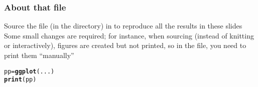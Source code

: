 \documentclass[aspectratio=169]{beamer}\usepackage[]{graphicx}\usepackage[]{xcolor}
\makeatletter
\newcommand{\hldef}[1]{\textcolor[rgb]{0.345,0.345,0.345}{#1}}%
\newcommand{\hlkwb}[1]{\textcolor[rgb]{0.69,0.353,0.396}{#1}}%
\newcommand{\hlkwd}[1]{\textcolor[rgb]{0.737,0.353,0.396}{\textbf{#1}}}%
\newenvironment{kframe}{%
 \def\at@end@of@kframe{}%
 \ifinner\ifhmode%
  \def\at@end@of@kframe{\end{minipage}}%
  \begin{minipage}{\columnwidth}%
 \fi\fi%
 \def\FrameCommand##1{\hskip\@totalleftmargin \hskip-\fboxsep
 \colorbox{shadecolor}{##1}\hskip-\fboxsep
     \hskip-\linewidth \hskip-\@totalleftmargin \hskip\columnwidth}%
 \MakeFramed {\advance\hsize-\width
   \@totalleftmargin\z@ \linewidth\hsize
   \@setminipage}}%
 {\par\unskip\endMakeFramed%
 \at@end@of@kframe}
\newenvironment{knitrout}{}{} %
\makeatother
\begin{document}
\begin{frame}[fragile]\frametitle{About that  file}
Source the file  (in the  directory) in  to reproduce all the results in these slides
\vfill
Some small changes are required; for instance, when sourcing (instead of knitting or interactively),  figures are created but not printed, so in the  file, you need to print them ``manually''
\vfill
\begin{knitrout}
\color{fgcolor}\begin{kframe}
\begin{alltt}
\hldef{pp} \hlkwb{=} \hlkwd{ggplot}\hldef{(...)}
\hlkwd{print}\hldef{(pp)}
\end{alltt}
\end{kframe}
\end{knitrout}
\end{frame}
\end{document}
